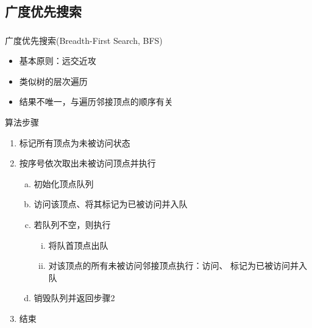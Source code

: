 \subsection{广度优先搜索}

\begin{frame}
    \frametitle{\insertsubsectionhead}
    \begin{block}{广度优先搜索(Breadth-First Search, BFS)}
        \begin{itemize}
            \item 基本原则：远交近攻
            \item 类似树的层次遍历
            \item 结果不唯一，与遍历邻接顶点的顺序有关
        \end{itemize}
    \end{block}
    \begin{alertblock}{算法步骤}
        \begin{enumerate}
            \item 标记所有顶点为\alert{未被访问}状态
            \item 按序号依次取出\alert{未被访问}顶点并执行
                  \begin{enumerate}[a.]
                      \item 初始化顶点队列
                      \item 访问该顶点、将其标记为\alert{已被访问}并入队
                      \item 若队列不空，则执行
                            \begin{enumerate}[i.]
                                \item 将队首顶点出队
                                \item 对该顶点的所有未被访问邻接顶点执行：访问、
                                      标记为\alert{已被访问}并入队
                            \end{enumerate}
                      \item 销毁队列并返回步骤2
                  \end{enumerate}
            \item 结束
        \end{enumerate}
    \end{alertblock}
\end{frame}

